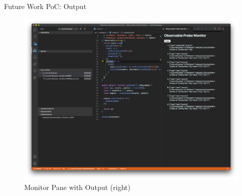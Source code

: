 \documentclass[aspectratio=169]{beamer}
\begin{document}
\begin{frame}[fragile]{Future Work PoC: Output}
    \begin{figure}[H]
        \centering
        \includegraphics[height=0.7\textheight]{figures/backup-screenshots/step8.png}
        \caption{Monitor Pane with Output (right)}
    \end{figure}
\end{frame}
\end{document}
